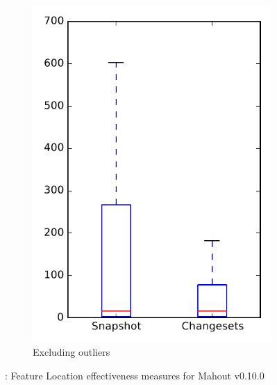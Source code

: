 \begin{figure}
\begin{subfigure}{.4\textwidth}
        \includegraphics[height=0.4\textheight]{figures/flt/rq1_mahout_no_outlier}
        \caption{Excluding outliers}\label{fig:flt:rq1:mahout_no_outlier}
    \end{subfigure}
\caption{\fone: Feature Location effectiveness measures for Mahout v0.10.0}
\label{fig:flt:rq1:mahout}
\end{figure}
